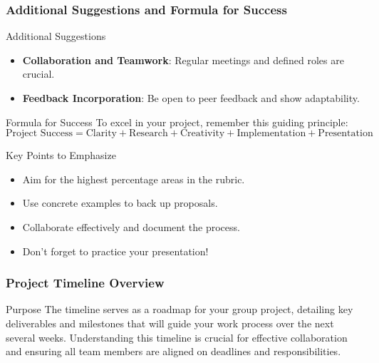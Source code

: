 \documentclass[aspectratio=169]{beamer}
\begin{document}
\begin{frame}[fragile]
    \frametitle{Additional Suggestions and Formula for Success}
    \begin{block}{Additional Suggestions}
        \begin{itemize}
            \item \textbf{Collaboration and Teamwork}: Regular meetings and defined roles are crucial.
            \item \textbf{Feedback Incorporation}: Be open to peer feedback and show adaptability.
        \end{itemize}
    \end{block}
    
    \begin{block}{Formula for Success}
    To excel in your project, remember this guiding principle:
    \begin{equation}
    \text{Project Success} = \text{Clarity} + \text{Research} + \text{Creativity} + \text{Implementation} + \text{Presentation}
    \end{equation}
    \end{block}

    \begin{block}{Key Points to Emphasize}
    \begin{itemize}
        \item Aim for the highest percentage areas in the rubric.
        \item Use concrete examples to back up proposals.
        \item Collaborate effectively and document the process.
        \item Don't forget to practice your presentation!
    \end{itemize}
    \end{block}
\end{frame}

\begin{frame}[fragile]
    \frametitle{Project Timeline Overview}
    
    \begin{block}{Purpose}
        The timeline serves as a roadmap for your group project, detailing key deliverables and milestones that will guide your work process over the next several weeks. Understanding this timeline is crucial for effective collaboration and ensuring all team members are aligned on deadlines and responsibilities.
    \end{block}
\end{frame}
\end{document}
